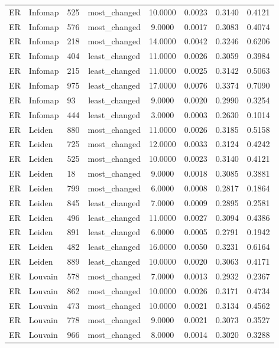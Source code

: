 \begin{longtable}{lllccccc}
ER & Infomap & 525 & most\_changed & 10.0000 & 0.0023 & 0.3140 & 0.4121 \\
ER & Infomap & 576 & most\_changed & 9.0000 & 0.0017 & 0.3083 & 0.4074 \\
ER & Infomap & 218 & most\_changed & 14.0000 & 0.0042 & 0.3246 & 0.6206 \\
ER & Infomap & 404 & least\_changed & 11.0000 & 0.0026 & 0.3059 & 0.3984 \\
ER & Infomap & 215 & least\_changed & 11.0000 & 0.0025 & 0.3142 & 0.5063 \\
ER & Infomap & 975 & least\_changed & 17.0000 & 0.0076 & 0.3374 & 0.7090 \\
ER & Infomap & 93 & least\_changed & 9.0000 & 0.0020 & 0.2990 & 0.3254 \\
ER & Infomap & 444 & least\_changed & 3.0000 & 0.0003 & 0.2630 & 0.1014 \\
ER & Leiden & 880 & most\_changed & 11.0000 & 0.0026 & 0.3185 & 0.5158 \\
ER & Leiden & 725 & most\_changed & 12.0000 & 0.0033 & 0.3124 & 0.4242 \\
ER & Leiden & 525 & most\_changed & 10.0000 & 0.0023 & 0.3140 & 0.4121 \\
ER & Leiden & 18 & most\_changed & 9.0000 & 0.0018 & 0.3085 & 0.3881 \\
ER & Leiden & 799 & most\_changed & 6.0000 & 0.0008 & 0.2817 & 0.1864 \\
ER & Leiden & 845 & least\_changed & 7.0000 & 0.0009 & 0.2895 & 0.2581 \\
ER & Leiden & 496 & least\_changed & 11.0000 & 0.0027 & 0.3094 & 0.4386 \\
ER & Leiden & 891 & least\_changed & 6.0000 & 0.0005 & 0.2791 & 0.1942 \\
ER & Leiden & 482 & least\_changed & 16.0000 & 0.0050 & 0.3231 & 0.6164 \\
ER & Leiden & 889 & least\_changed & 10.0000 & 0.0020 & 0.3063 & 0.4171 \\
ER & Louvain & 578 & most\_changed & 7.0000 & 0.0013 & 0.2932 & 0.2367 \\
ER & Louvain & 862 & most\_changed & 10.0000 & 0.0026 & 0.3171 & 0.4734 \\
ER & Louvain & 473 & most\_changed & 10.0000 & 0.0021 & 0.3134 & 0.4562 \\
ER & Louvain & 778 & most\_changed & 9.0000 & 0.0021 & 0.3073 & 0.3527 \\
ER & Louvain & 966 & most\_changed & 8.0000 & 0.0014 & 0.3020 & 0.3288 \\

\end{longtable}
